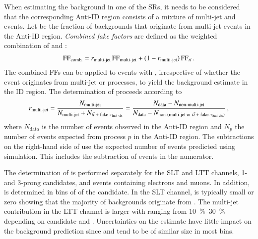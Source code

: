 When estimating the \faketauhadvis background in one of the \lephad SRs, it
needs to be considered that the corresponding Anti-ID region consists of a
mixture of multi-jet and \ttbarFakes events. Let \rqcd be the fraction of
\faketauhadvis backgrounds that originate from multi-jet events in the Anti-ID
region. \emph{Combined fake factors} are defined as the weighted combination of
\FFqcd and \FFttbar:
\begin{align*}
  \text{FF}_{\text{comb.}} = r_{\text{multi-jet}} \, \text{FF}_{\text{multi-jet}} + (1 - r_{\text{multi-jet}}) \, \text{FF}_{t\bar{t}} \,\text{.}
\end{align*}
The combined FFs can be applied to events with \faketauhadvis, irrespective of
whether the event originates from multi-jet or \ttbar processes, to yield the
background estimate in the ID region. The determination of \rqcd proceeds
according to
\begin{align}
  \rqcd =
  \frac{N_{\text{multi-jet}}}{N_{\text{multi-jet}} + N_{\text{\ttbarFakes}}}
  = \frac
  { N_{\text{data}} - N_{\text{non-multi-jet}} }
  { N_{\text{data}} - N_{\text{non-(multi-jet or \ttbarFakes)}} } \,\text{,}
  \label{eq:rqcd}
\end{align}
where $N_{\text{data}}$ is the number of events observed in the Anti-ID region
and $N_{p}$ the number of events expected from process $p$ in the Anti-ID
region. The subtractions on the right-hand side of  use the
expected number of events predicted using simulation. This includes the
subtraction of \ttbarFakes events in the numerator.

The determination of \rqcd is performed separately for the \lephad SLT and LTT
channels, 1- and 3-prong \tauhadvis candidates, and events containing electrons
and muons. In addition, \rqcd is determined in bins of \pT of the \tauhadvis
candidate. In the SLT channel, \rqcd is typically small or zero showing that the
majority of \faketauhadvis backgrounds originate from \ttbar. The multi-jet
contribution in the LTT channel is larger with \rqcd ranging from
\SIrange{10}{30}{\percent} depending on \tauhadvis candidate \pT and
\Ntracks. Uncertainties on the \rqcd estimate have little impact on the
\faketauhadvis background prediction since \FFqcd and \FFttbar tend to be of
similar size in most bins.

